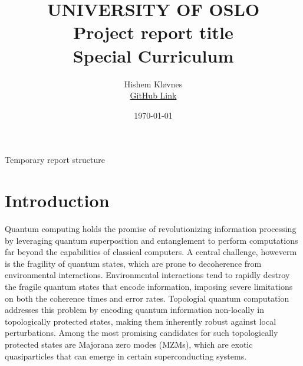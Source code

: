 \documentclass[11pt, letterpaper, titlepage]{article}
\title{
 \textbf{\LARGE UNIVERSITY OF OSLO} \\
\vspace{37mm}
\textbf{\Large Project report title}\\
\vspace{7mm}
\Large Special Curriculum \\
\vspace{25mm}
}
\author{\Large Hishem Kløvnes \\ \textcolor{blue}{\href{https://github.com/hishemok/Special_curriculum}{GitHub Link} }}
\date{\Large \today} %
\begin{document}
\maketitle
\newpage



\Large Temporary report structure
\section{Introduction}
Quantum computing holds the promise of revolutionizing information processing by leveraging quantum superposition and entanglement to perform computations far beyond the capabilities of classical computers. A central challenge, howeverm is the fragility of quantum states, which are prone to decoherence from environmental interactions. Environmental interactions tend to rapidly destroy the fragile quantum states that encode information, imposing severe limitations on both the coherence times and error rates. Topologial quantum computation addresses this problem by encoding quantum information non-locally in topologically protected states, making them inherently robust against local perturbations. Among the most promising candidates for such topologically protected states are Majorana zero modes (MZMs), which are exotic quasiparticles that can emerge in certain superconducting systems.\\ \\ 
\end{document}
